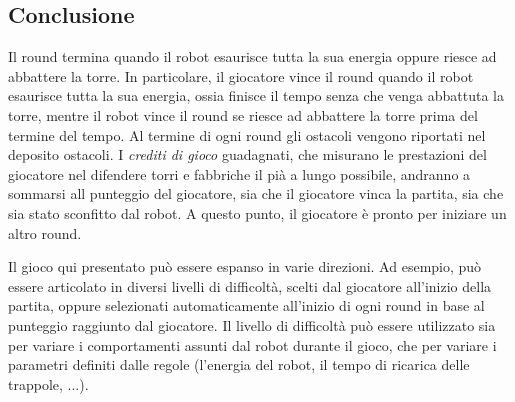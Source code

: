 	\subsection*{Conclusione} 
Il round termina quando il robot esaurisce tutta la sua energia oppure riesce ad abbattere la torre. In particolare, il giocatore vince il round quando il robot esaurisce tutta la sua energia, ossia finisce il tempo senza che venga abbattuta la torre, mentre il robot vince il round se riesce ad abbattere la torre prima del termine del tempo.
Al termine di ogni round gli ostacoli vengono riportati nel deposito ostacoli.
I \emph{crediti di gioco} guadagnati, che misurano le prestazioni del giocatore nel difendere torri e fabbriche il pià a lungo possibile, andranno a sommarsi all punteggio del giocatore, sia che il giocatore vinca la partita, sia che sia stato sconfitto dal robot.
A questo punto, il giocatore è pronto per iniziare un altro round.

\begin{nota}
Il gioco qui presentato può essere espanso in varie direzioni. Ad esempio, può essere articolato in diversi livelli di difficoltà, scelti dal giocatore all'inizio della partita, oppure selezionati automaticamente all'inizio di ogni round in base al punteggio raggiunto dal giocatore. Il livello di difficoltà può essere utilizzato sia per variare i comportamenti assunti dal robot durante il gioco, che per variare i parametri definiti dalle regole (l'energia del robot, il tempo di ricarica delle trappole, ...).
\end{nota}

